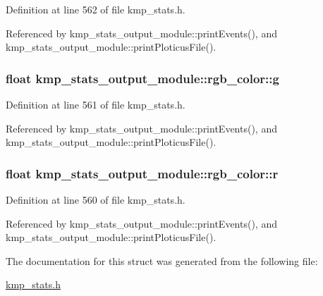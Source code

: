 Definition at line 562 of file kmp\-\_\-stats.\-h.



Referenced by kmp\-\_\-stats\-\_\-output\-\_\-module\-::print\-Events(), and kmp\-\_\-stats\-\_\-output\-\_\-module\-::print\-Ploticus\-File().

\hypertarget{structkmp__stats__output__module_1_1rgb__color_a655d2c8f77d84a19aaf715f2751abd3d}{
\subsubsection[{g}]{\setlength{\rightskip}{0pt plus 5cm}float kmp\-\_\-stats\-\_\-output\-\_\-module\-::rgb\-\_\-color\-::g}}\label{structkmp__stats__output__module_1_1rgb__color_a655d2c8f77d84a19aaf715f2751abd3d}


Definition at line 561 of file kmp\-\_\-stats.\-h.



Referenced by kmp\-\_\-stats\-\_\-output\-\_\-module\-::print\-Events(), and kmp\-\_\-stats\-\_\-output\-\_\-module\-::print\-Ploticus\-File().

\hypertarget{structkmp__stats__output__module_1_1rgb__color_af0da06f47d8354186744158fbd406733}{
\subsubsection[{r}]{\setlength{\rightskip}{0pt plus 5cm}float kmp\-\_\-stats\-\_\-output\-\_\-module\-::rgb\-\_\-color\-::r}}\label{structkmp__stats__output__module_1_1rgb__color_af0da06f47d8354186744158fbd406733}


Definition at line 560 of file kmp\-\_\-stats.\-h.



Referenced by kmp\-\_\-stats\-\_\-output\-\_\-module\-::print\-Events(), and kmp\-\_\-stats\-\_\-output\-\_\-module\-::print\-Ploticus\-File().



The documentation for this struct was generated from the following file\-:\begin{DoxyCompactItemize}
\item 
\hyperlink{kmp__stats_8h}{kmp\-\_\-stats.\-h}\end{DoxyCompactItemize}
